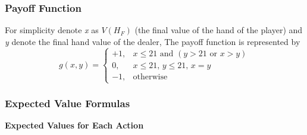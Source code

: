 \documentclass[12pt,a4paper]{cibb}
\begin{document}
\subsubsection*{Payoff Function}
For simplicity denote \textit{x} as \( V(H_F)\) (the final value of the hand of the player) and \textit{y} denote the final hand value of the dealer,  
The payoff function is represented by
\[
g(x, y) =
\begin{cases}
+1, & x \leq 21 \text{ and } (y > 21 \text{ or } x > y) \\
0, & x \leq 21,\, y \leq 21,\, x = y \\
-1, & \text{otherwise}
\end{cases}
\]
\subsubsection*{Expected Value Formulas}

\textbf{Expected Values for Each Action}
\end{document}
